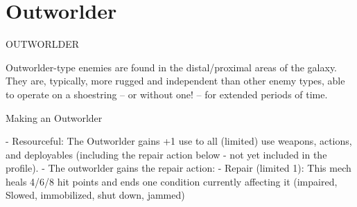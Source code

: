 \section{Outworlder}
                                            OUTWORLDER   

Outworlder-type enemies are found in the distal/proximal areas of the galaxy. They are, typically,  
more rugged and independent than other enemy types, able to operate on a shoestring -- or  
without one! -- for extended periods of time.  
 

Making an Outworlder
 

    -    Resourceful: The Outworlder gains +1 use to all (limited) use weapons, actions, and  
        deployables (including the repair action below - not yet included in the profile).  
    -   The outworlder gains the repair action:  
             -   Repair (limited 1): This mech heals 4/6/8 hit points and ends one condition  
                 currently affecting it (impaired, Slowed, immobilized, shut down, jammed)  

                                    